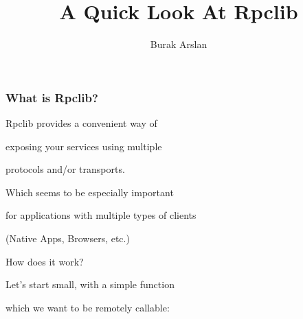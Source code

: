 \documentclass{beamer}
\title{A Quick Look At Rpclib}
\author{Burak Arslan}
\begin{document}
\begin{frame}
  \maketitle
\end{frame}

\begin{frame}
  \frametitle{What is Rpclib?}
  
  \LARGE 
\begin{center}
 
  Rpclib provides a convenient way of 

  \bigskip

  exposing your services using multiple 

  \bigskip

  protocols and/or transports.

\end{center}


\end{frame}


\begin{frame}
\LARGE
\begin{center}
  
  Which seems to be especially important 

  \bigskip

  for applications with multiple types of clients

  \large

  \bigskip

  (Native Apps, Browsers, etc.)

\end{center}

\end{frame}

\begin{frame}
\Huge
\begin{center}
  
  How does it work?

\end{center}

\end{frame}

\begin{frame}[fragile]
  \LARGE 
\begin{center}

  Let's start small, with a simple function

  \bigskip

  which we want to be remotely callable:
\end{center}
\end{frame}
\end{document}
